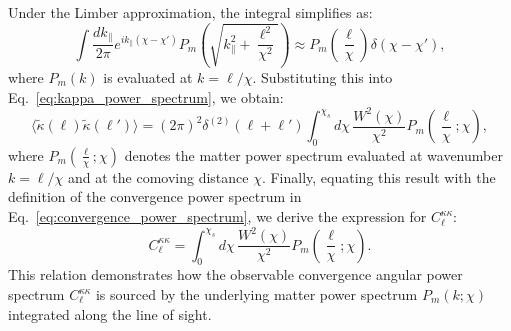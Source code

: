 Under the Limber approximation, the integral simplifies as:
\begin{equation}
    \int \frac{dk_\parallel}{2\pi} e^{i k_\parallel (\chi - \chi')} P_m\left(\sqrt{k_\parallel^2 + \frac{\ell^2}{\chi^2}}\right) \approx P_m\left(\frac{\ell}{\chi}\right) \delta(\chi - \chi'),
    \label{eq:limber_approximation}
\end{equation}
where \( P_m(k) \) is evaluated at \( k = \ell/\chi \).
Substituting this into Eq.~\eqref{eq:kappa_power_spectrum}, we obtain:
\begin{equation}
    \langle \tilde{\kappa}(\boldsymbol{\ell}) \tilde{\kappa}(\boldsymbol{\ell}') \rangle = (2\pi)^2 \delta^{(2)}(\boldsymbol{\ell} + \boldsymbol{\ell}') \int_0^{\chi_s} d\chi \, \frac{W^2(\chi)}{\chi^2} P_m\left(\frac{\ell}{\chi}; \chi\right),
    \label{eq:kappa_power_spectrum_final}
\end{equation}
where \( P_m\left(\frac{\ell}{\chi}; \chi\right) \) denotes the matter power spectrum evaluated at wavenumber \( k = \ell/\chi \) and at the comoving distance \( \chi \).
Finally, equating this result with the definition of the convergence power spectrum in Eq.~\eqref{eq:convergence_power_spectrum}, we derive the expression for \( C_{\ell}^{\kappa\kappa} \):
\begin{equation}
    C_{\ell}^{\kappa\kappa} = \int_0^{\chi_s} d\chi \, \frac{W^2(\chi)}{\chi^2} P_m\left(\frac{\ell}{\chi}; \chi\right).
    \label{eq:convergence_power_spectrum_final}
\end{equation}
This relation demonstrates how the observable convergence angular power spectrum \( C_{\ell}^{\kappa\kappa} \) is sourced by the underlying matter power spectrum \( P_m(k; \chi) \) integrated along the line of sight.

